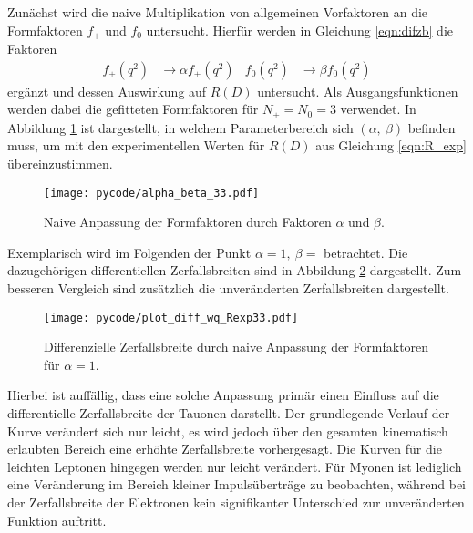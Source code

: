 Zunächst wird die naive Multiplikation von allgemeinen Vorfaktoren an die Formfaktoren $f_+$ und $f_0$ untersucht.
Hierfür werden in Gleichung \eqref{eqn:difzb} die Faktoren
\begin{align*}
  f_+(q^2) &\to \alpha f_+(q^2) & f_0(q^2) &\to \beta f_0(q^2)
\end{align*}
ergänzt und dessen Auswirkung auf $R(D)$ untersucht.
Als Ausgangsfunktionen werden dabei die gefitteten Formfaktoren für $N_+ = N_0 = \num{3}$ verwendet.
In Abbildung \ref{fig:alpha_beta} ist dargestellt, in welchem Parameterbereich sich $(\alpha, \: \beta)$ befinden muss, um mit den experimentellen Werten für $R(D)$ aus Gleichung \eqref{eqn:R_exp} übereinzustimmen.
\begin{figure}
  \centering
  \texttt{[image: pycode/alpha\_beta\_33.pdf]}
  \caption{Naive Anpassung der Formfaktoren durch Faktoren $\alpha$ und $\beta$.}
  \label{fig:alpha_beta}
\end{figure}
Exemplarisch wird im Folgenden der Punkt $\alpha = {1}, \: \beta = $ betrachtet.
Die dazugehörigen differentiellen Zerfallsbreiten sind in Abbildung \ref{fig:alpha_beta_wq} dargestellt.
Zum besseren Vergleich sind zusätzlich die unveränderten Zerfallsbreiten dargestellt.
\begin{figure}
  \centering
  \texttt{[image: pycode/plot\_diff\_wq\_Rexp33.pdf]}
  \caption{Differenzielle Zerfallsbreite durch naive Anpassung der Formfaktoren für $\alpha = \num{1}$.}
  \label{fig:alpha_beta_wq}
\end{figure}
Hierbei ist auffällig, dass eine solche Anpassung primär einen Einfluss auf die differentielle Zerfallsbreite der Tauonen darstellt.
Der grundlegende Verlauf der Kurve verändert sich nur leicht, es wird jedoch über den gesamten kinematisch erlaubten Bereich eine erhöhte Zerfallsbreite vorhergesagt.
Die Kurven für die leichten Leptonen hingegen werden nur leicht verändert.
Für Myonen ist lediglich eine Veränderung im Bereich kleiner Impulsüberträge zu beobachten, während bei der Zerfallsbreite der Elektronen kein signifikanter Unterschied zur unveränderten Funktion auftritt.

